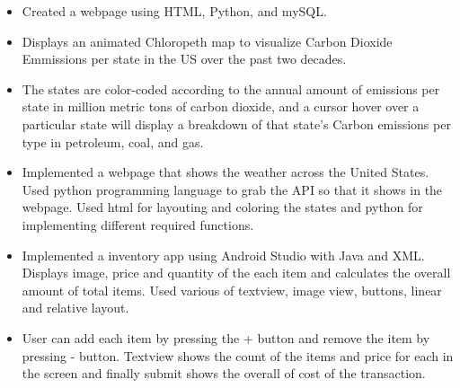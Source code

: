 \documentclass[10pt,a4paper,sans]{moderncv} %
\begin{document}
{}
\begin{itemize}
\vspace{-6mm}
\item{Created a webpage using HTML, Python, and mySQL.}
\item{Displays an animated Chloropeth map to visualize Carbon Dioxide Emmissions per state in the US over the past two decades.}
\item{The states are color-coded according to the annual amount of emissions per state in million metric tons of carbon dioxide, and a cursor hover over a particular state will display a breakdown of that state's Carbon emissions per type in petroleum, coal, and gas.}
\end{itemize}
\begin{itemize}
\vspace{-6mm}
\item{Implemented a webpage that shows the weather across the United States. Used python programming language to grab the API so that it shows in the webpage. Used html for layouting and coloring the states and python for implementing different required functions.}
\end{itemize}
{}
\begin{itemize}
\vspace{-6mm}
\item{Implemented a inventory app using Android Studio with Java and XML. Displays image, price and quantity of the each item and calculates the overall amount of total items. Used various of textview, image view, buttons, linear and relative layout.}
\item{User can add each item by pressing the + button and remove the item by pressing - button. Textview shows the count of the items and price for each in the screen and finally submit shows the overall of cost of the transaction.}
\end{itemize}
\end{document}
